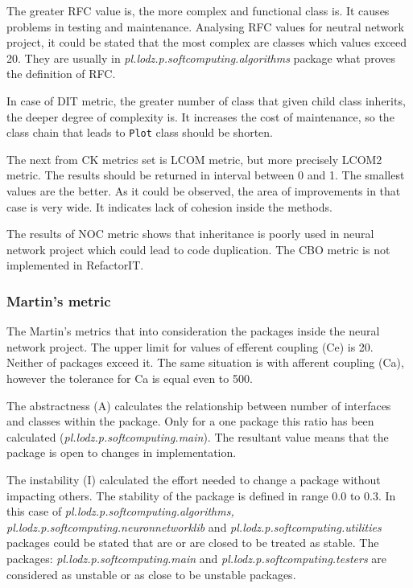 The greater \ac{RFC} value is, the more complex and functional class is. It causes problems in testing and maintenance. Analysing \ac{RFC} values for neutral network project, it could be stated that the most complex are classes which values exceed 20. They are usually in \textit{pl.lodz.p.softcomputing.algorithms} package what proves the definition of \ac{RFC}.       

In case of \ac{DIT} metric, the greater number of class that given child class inherits, the deeper degree of complexity is. It increases the cost of maintenance, so the class chain that leads to \texttt{Plot} class should be shorten. 

The next from \ac{CK metrics} set is \ac{LCOM} metric, but more precisely LCOM2 metric. The results should be returned in interval between 0 and 1. The smallest values are the better. As it could be observed, the area of improvements in that case is very wide. It indicates lack of cohesion inside the methods.  

The results of \ac{NOC} metric shows that inheritance is poorly used in neural network project which could lead to code duplication. The \ac{CBO} metric is not implemented in RefactorIT.

\subsubsection*{Martin's metric}
The Martin's metrics that into consideration the packages inside the neural network project. The upper limit for values of efferent coupling (\ac{Ce}) is 20. Neither of packages exceed it. The same situation is with afferent coupling (\ac{Ca}), however the tolerance for \ac{Ca} is equal even to 500. 

The abstractness (\ac{A}) calculates the relationship between number of interfaces and classes within the package. Only for a one package this ratio has been calculated (\textit{pl.lodz.p.soft\-com\-pu\-ting.main}). The resultant value means that the package is open to changes in implementation.

The instability (\ac{I}) calculated the effort needed to change a package without impacting others. The stability of the package is defined in range 0.0 to 0.3. In this case of \textit{pl.lodz.p.soft\-com\-pu\-ting.al\-go\-rithms, pl.lodz.p.soft\-com\-pu\-ting.neu\-ron\-net\-work\-lib} and \textit{pl.\-lodz.\-p.\-soft\-com\-pu\-ting.u\-ti\-li\-ties} packages could be stated that are or are closed to be treated as stable. The packages: \textit{pl.lodz.p.soft\-com\-pu\-ting.main} and \textit{pl.lodz.p.soft\-com\-pu\-ting.tes\-ters} are considered as unstable or as close to be unstable packages.

